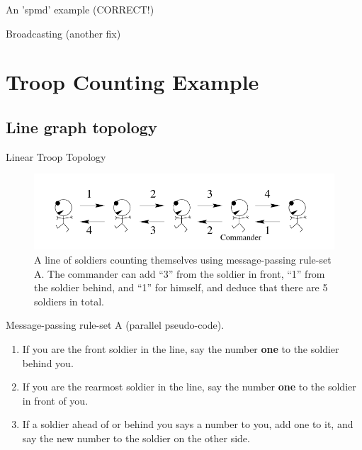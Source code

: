 \documentclass[pdflatex,colorlinks,landscape]{beamer}
\begin{document}
\begin{frame}[allowframebreaks]{An 'spmd' example (CORRECT!)}
  \begin{tiny}
    
  \end{tiny}
  \begin{tiny}
  \end{tiny}
\end{frame}

\begin{frame}[allowframebreaks]{Broadcasting (another fix)}
  \begin{tiny}
    
  \end{tiny}
  \begin{tiny}
  \end{tiny}
\end{frame}

\section{Troop Counting Example}

\subsection{Line graph topology}
\begin{frame}{Linear Troop Topology}
  \begin{figure}[H]
    \begin{center}
      \includegraphics[width=\textwidth]{LinearTroop.png}
    \end{center}
    \caption{A line of soldiers counting themselves using
      message-passing rule-set A. The commander can add ``3'' from the
      soldier in front, ``1'' from the soldier behind, and ``1'' for
      himself, and deduce that there are 5 soldiers in total.}
  \end{figure}
\end{frame}


\begin{frame}{Message-passing rule-set A (parallel pseudo-code).}
  \begin{enumerate}
  \item If you are the front soldier in the line, say the number \textbf{one} to the
    soldier behind you.
  \item If you are the rearmost soldier in the line, say the number \textbf{one} to
    the soldier in front of you.
  \item If a soldier ahead of or behind you says a number to you, add one
    to it, and say the new number to the soldier on the other side.
  \end{enumerate}
\end{frame}
\end{document}
